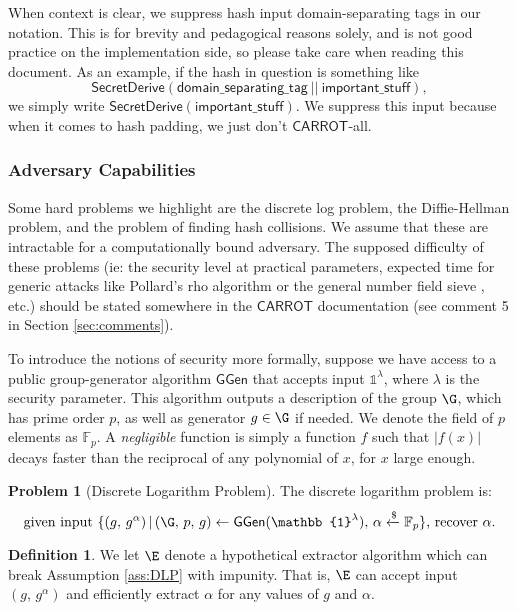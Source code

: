 \documentclass{article}
\theoremstyle{definition}
\newtheorem{definition}{Definition}
\newtheorem{problem}{Problem}
\newcommand{\Fp}{\mathbb{F}_p}
\newcommand{\6}{\mathbf}
\newcommand{\7}{\mathcal}
\newcommand{\lar}{\leftarrow}
\newcommand{\lsamp}{\xleftarrow{\$}}
\newcommand{\one}{\mathbb{1}}
\newcommand{\secr}[1]{{\mathsf{SecretDerive}(\sf{#1})}}
\renewcommand{\sf}[1]{{\mathsf{#1}}}
\newcommand{\carr}{$\sf{CARROT}$ }
\begin{document}
When context is clear, we suppress hash input domain-separating tags in our notation. 
This is for brevity and pedagogical reasons solely, and is not good practice on the implementation side, so please take care when reading this document. 
As an example, if the hash in question is something like
$$\secr{\sf{domain\_separating\_tag} \ || \ \sf{important\_stuff}},$$
we simply write $\secr{\sf{important\_stuff}}$.
We suppress this input because when it comes to hash padding, we just don't $\sf{CARROT}$-all.
\medskip 





\subsubsection{Adversary Capabilities}

Some hard problems we highlight are the discrete log problem, the Diffie-Hellman problem, and the problem of finding hash collisions. We assume that these are intractable for a computationally bound adversary. The supposed difficulty of these problems (ie: the security level at practical parameters, expected time for generic attacks like Pollard's rho algorithm \cite{PollardRho} or the general number field sieve \cite{NumberFieldSieve}, etc.) should be stated somewhere in the \carr documentation (see comment 5 in Section \ref{sec:comments}). 
\medskip


To introduce the notions of security more formally, suppose we have access to a public group-generator algorithm $\mathsf{GGen}$ that accepts input $\one^\lambda$,
where $\lambda$ is the security parameter. This algorithm outputs a description of the group $\G$, which has prime order $p$, as well as generator $g \in \G$ if needed. We denote the field of $p$ elements as $\Fp$. A \textit{negligible} function is simply a function $f$ such that $|f(x)|$ decays faster than the reciprocal of any polynomial of $x$, for $x$ large enough.

\begin{problem}[Discrete Logarithm Problem]\label{prob:DLP}
    The discrete logarithm problem is:
    $$\text{given input } \{(g, \, g^{\alpha}) \, | \, (\G, \, p, \, g) \lar \mathsf{GGen}(\one^\lambda), \, \alpha \lsamp \Fp\} \text{, recover } \alpha.$$ 
\end{problem}


\begin{definition}\label{def:extractor}
    We let $\E$ denote a hypothetical extractor algorithm which can break Assumption \ref{ass:DLP} with impunity. That is, $\E$ can accept input $(g, \, g^{\alpha})$ and efficiently extract $\alpha$ for any values of $g$ and $\alpha$.
\end{definition}
\end{document}

